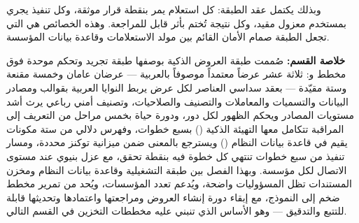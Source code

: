 وبذلك يكتمل عقد الطبقة: كل استعلام يمر بنقطة قرار موثقة، وكل تنفيذ يجري بمستخدم معزول مقيد، وكل نتيجة تُختم بأثر قابل للمراجعة. وهذه الخصائص هي التي تجعل الطبقة صمام الأمان القائم بين مولد الاستعلامات وقاعدة بيانات المؤسسة.

\medskip

\noindent\textbf{خلاصة القسم:}
صُممت طبقة العروض الذكية بوصفها طبقة تجريد وتحكم موحدة فوق مخطط  و: ثلاثة عشر عرضاً معتمداً موصوفاً بالعربية — عرضان عامان وخمسة مقنعة وستة مقيّدة — بعقد سداسي العناصر لكل عرض يربط النوايا العربية بقوالب  ومصادر البيانات والتسميات والمعاملات والتصنيف والصلاحيات، وتصنيف أمني رباعي يرث أشد مستويات المصادر ويحكم الظهور لكل دور، ودورة حياة بخمس مراحل من التعريف إلى المراقبة تتكامل معها التهيئة الذكية () بسبع خطوات، وفهرس دلالي من ستة مكونات يقيم في قاعدة بيانات النظام () ويسترجع بالمعنى ضمن ميزانية توكنز محددة، ومسار تنفيذ من سبع خطوات تنتهي كل خطوة فيه بنقطة تحقق، مع عزل بنيوي عند مستوى الاتصال لكل مؤسسة.
وبهذا الفصل بين طبقة  التشغيلية وقاعدة بيانات النظام ومخزن المستندات  تظل المسؤوليات واضحة، ويُدعم تعدد المؤسسات، ويُحد من تمرير مخطط ضخم إلى النموذج، مع إبقاء دورة إنشاء العروض ومراجعتها واعتمادها وتحديثها قابلة للتتبع والتدقيق — وهو الأساس الذي تنبني عليه مخططات التخزين في القسم التالي.
\par
